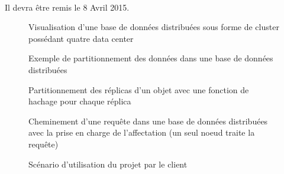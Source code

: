 \documentclass[12pt]{article}
\begin{document}
\paragraph{} Il devra être remis le 8 Avril 2015.


\begin{figure}[p]
	\centering
		
	\caption{Visualisation d'une base de données distribuées sous forme de cluster possédant quatre data center\label{fig:distributed_database}}
\end{figure}

\begin{figure}[p]
	\centering
		
	\caption{Exemple de partitionnement des données dans une base de données distribuées\label{fig:partitionning}}
\end{figure}

\begin{figure}[p]
	\centering
		
	\caption{Partitionnement des réplicas d'un objet avec une fonction de hachage pour chaque réplica\label{fig:multi_hash_partitionning}}
\end{figure}

\begin{figure}[p]
	\centering
		
	\caption{Cheminement d'une requête dans une base de données distribuées avec la prise en charge de l'affectation (un seul noeud traite la requête)\label{fig:request}}
\end{figure}

\begin{figure}[p]
	\centering
		
	\caption{Scénario d'utilisation du projet par le client\label{fig:user_scenario}}
\end{figure}


\end{document}
